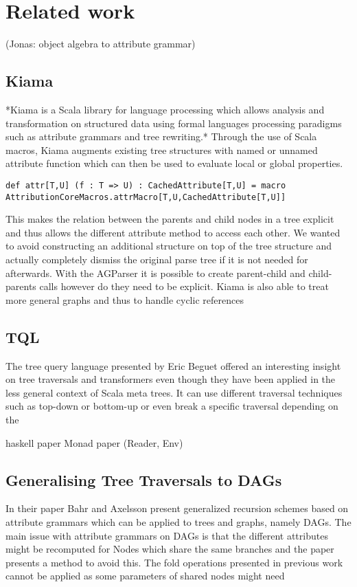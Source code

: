 \section{Related work}
(Jonas: object algebra to attribute grammar)
\subsection{Kiama}
*Kiama is a Scala library for language processing which allows analysis and transformation on structured data using formal languages processing paradigms such as attribute grammars and tree rewriting.*
Through the use of Scala macros, Kiama augments existing tree structures with named or unnamed attribute function which can then be used to evaluate local or global properties.
\begin{verbatim}def attr[T,U] (f : T => U) : CachedAttribute[T,U] = macro AttributionCoreMacros.attrMacro[T,U,CachedAttribute[T,U]]\end{verbatim}
This makes the relation between the parents and child nodes in a tree explicit and thus allows the different attribute method to access each other. We wanted to avoid constructing an additional structure on top of the tree structure and actually completely dismiss the original parse tree if it is not needed for afterwards. With the AGParser it is possible to create parent-child and child-parents calls however do they need to be explicit.
Kiama is also able to treat more general graphs and thus to handle cyclic references

\subsection{TQL}
The tree query language presented by Eric Beguet offered an interesting insight on tree traversals and transformers even though they have been applied in the less general context of Scala meta trees. It can use different traversal techniques such as top-down or bottom-up or even break a specific traversal depending on the 

haskell paper
Monad paper (Reader, Env)

\subsection{Generalising Tree Traversals to DAGs}
In their paper Bahr and Axelsson present generalized recursion schemes based on attribute grammars which can be applied to trees and graphs, namely DAGs. The main issue with attribute grammars on DAGs is that the different attributes might be recomputed for Nodes which share the same branches and the paper presents a method to avoid this. The fold operations presented in previous work cannot be applied as some parameters of shared nodes might need 

